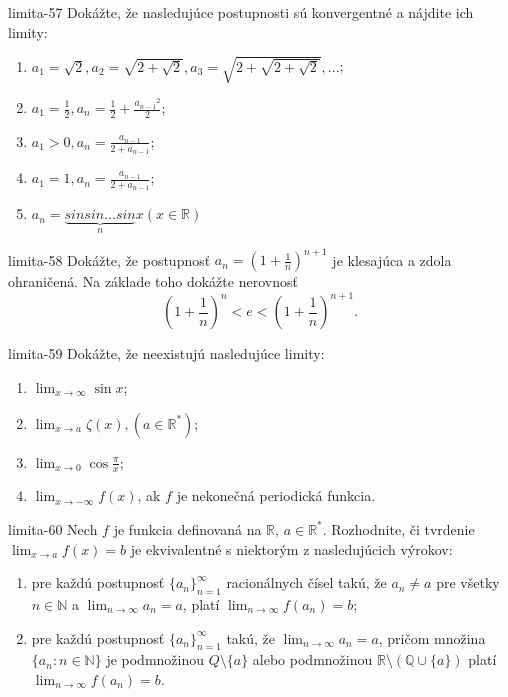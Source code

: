 \begin{defproblem}{limita-57}
Dokážte, že nasledujúce postupnosti sú konvergentné a nájdite ich limity:
\begin{enumerate}
\item $a_1=\sqrt{2}, a_2=\sqrt{2+\sqrt{2}}, a_3=\sqrt{2+\sqrt{2+\sqrt{2}}},...$;
\item $a_1=\frac{1}{2}, a_n=\frac{1}{2}+\frac{{a_{n-1}}^{2}}{2}$;
\item $a_1>0, a_n=\frac{a_{n-1}}{2+a_{n-1}}$;
\item $a_1=1, a_n=\frac{a_{n-1}}{2+a_{n-1}}$;
\item $a_n=\underbrace{sin sin ... sin}_n x (x \in \mathbb{R})$
\end{enumerate}
\end{defproblem}

\begin{defproblem}{limita-58}
Dokážte, že postupnosť $a_{n}=(1+\frac{1}{n})^{n+1}$ je klesajúca a zdola ohraničená. Na základe toho dokážte nerovnosť 
$$(1+\frac{1}{n})^n<e<(1+\frac{1}{n})^{n+1}.$$
\end{defproblem}

\begin{defproblem}{limita-59}
Dokážte, že neexistujú nasledujúce limity:
\begin{multicols}{2}
\begin{enumerate}
    \item $\lim_{{x \rightarrow \infty}} \sin x$;
    \item $\lim_{{x \rightarrow a}} \zeta (x), (a \in \mathbb{R^*})$;
    \item $\lim_{{x \rightarrow 0}} \cos \frac{\pi}{x}$;
    \item $\lim_{{x \rightarrow -\infty}} f(x)$, ak $f$ je nekonečná periodická funkcia.
\end{enumerate}
\end{multicols}
\end{defproblem}

\begin{defproblem}{limita-60}
Nech $f$ je funkcia definovaná na $\mathbb{R}$, $a \in \mathbb{R^*}$. Rozhodnite, či tvrdenie $\lim_{x \rightarrow a} f(x)=b$ je ekvivalentné s niektorým z nasledujúcich výrokov:
\begin{enumerate}
\item pre každú postupnosť ${\{a_n\}}_{n=1}^\infty$ racionálnych čísel takú, že $a_n \neq a$ pre všetky $n \in \mathbb{N}$ a $\lim_{n \rightarrow \infty} a_n=a$, platí $\lim_{n \rightarrow \infty} f(a_n)=b$;
\item pre každú postupnosť ${\{a_n\}}_{n=1}^\infty$ takú, že $\lim_{n \rightarrow \infty} a_n=a$, pričom množina $\{ a_n : n\in \mathbb{N }\}$ je podmnožinou $Q \setminus \{ a\}$ alebo podmnožinou $\mathbb{R} \setminus (\mathbb{Q} \cup \{ a\})$ platí $\lim_{n \rightarrow \infty} f(a_n)=b$.
\end{enumerate}
\end{defproblem}

